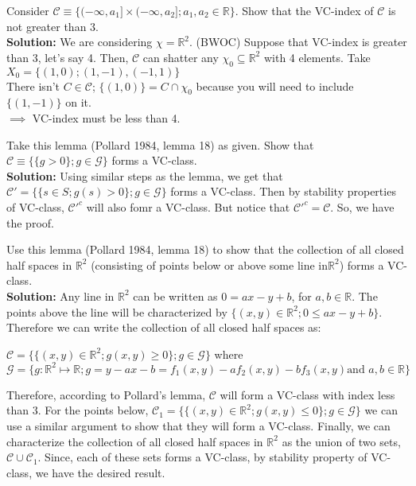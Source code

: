 \documentclass[11pt,letterpaper]{article}                  %
\begin{document}
\begin{problem} Consider $\mathcal{C}\equiv \{(-\infty, a_1] \times (-\infty, a_2]; a_1,a_2 \in \mathbb{R}\}$. Show that the VC-index of $\mathcal{C}$ is not greater than 3.\\

\textbf{Solution:} We are considering $\chi = \mathbb{R}^2$. (BWOC) Suppose that VC-index is greater than 3, let's say 4. Then, $\mathcal{C}$ can shatter any $\chi_0 \subseteq \mathbb{R}^2$ with 4 elements. Take $X_0 = \{(1,0); (1,-1), (-1,1)\}$\\

There isn't $C \in \mathcal{C}$; $\{(1,0)\} = C \cap \chi_0$ because you will need to include $\{(1,-1)\}$ on it.\\

$\implies$ VC-index must be less than 4.
\end{problem}

\bigskip
\begin{problem} Take this lemma (Pollard 1984, lemma 18) as given. Show that $\mathcal{C}\equiv \{\{g>0\}; g\in \mathcal{G}\}$ forms a VC-class.\\

\textbf{Solution:} Using similar steps as the lemma, we get that $\mathcal{C}' = \{\{s\in S; g(s)>0\}; g \in \mathcal{G}\}$ forms a VC-class. Then by stability properties of VC-class, $\mathcal{C}'^{c}$ will also fomr a VC-class. But notice that $\mathcal{C}'^{c} = \mathcal{C}$. So, we have the proof. 
\end{problem}

\bigskip
\begin{problem} Use this lemma (Pollard 1984, lemma 18) to show that the collection of all closed half spaces in $\mathbb{R}^2$ (consisting of points below or above some line in$\mathbb{R}^2$) forms a VC-class.\\

\textbf{Solution:} Any line in $\mathbb{R}^2$ can be written as $0=ax-y+b$, for $a,b \in \mathbb{R}$. The points above the line will be characterized by $\{(x,y)\in \mathbb{R}^2; 0\leq ax-y+b\}$. Therefore we can write the collection of all closed half spaces as:
\begin{center}
$\mathcal{C}=\{\{(x,y)\in \mathbb{R}^2; g(x,y)\geq 0\}; g \in \mathcal{G}\}$ where \\
$\mathcal{G}=\{g:\mathbb{R}^2\mapsto \mathbb{R}; g= y-ax-b = f_1(x,y) - a f_2(x,y) - bf_3(x,y) \text{and } a,b \in \mathbb{R}\}$
\end{center}
Therefore, according to Pollard's lemma, $\mathcal{C}$ will form a VC-class with index less than 3. For the points below, $\mathcal{C}_1=\{\{(x,y)\in \mathbb{R}^2; g(x,y)\leq 0\}; g \in \mathcal{G}\}$ we can use a similar argument to show that they will form a VC-class. Finally, we can characterize the collection of all closed half spaces in $\mathbb{R}^2$ as the union of two sets, $\mathcal{C} \cup \mathcal{C}_1$. Since, each of these sets forms a VC-class, by stability property of VC-class, we have the desired result. 
\end{problem}
\end{document}
